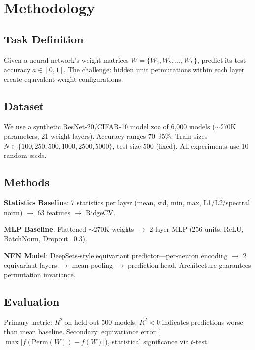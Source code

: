 \section{Methodology}

\subsection{Task Definition}

Given a neural network's weight matrices $W = \{W_1, W_2, \ldots, W_L\}$, predict its test accuracy $a \in [0, 1]$. The challenge: hidden unit permutations within each layer create equivalent weight configurations.

\subsection{Dataset}

We use a synthetic ResNet-20/CIFAR-10 model zoo of 6,000 models ($\sim$270K parameters, 21 weight layers). Accuracy ranges 70--95\%. Train sizes $N \in \{100, 250, 500, 1000, 2500, 5000\}$, test size 500 (fixed). All experiments use 10 random seeds.

\subsection{Methods}

\textbf{Statistics Baseline}: 7 statistics per layer (mean, std, min, max, L1/L2/spectral norm) $\rightarrow$ 63 features $\rightarrow$ RidgeCV.

\textbf{MLP Baseline}: Flattened $\sim$270K weights $\rightarrow$ 2-layer MLP (256 units, ReLU, BatchNorm, Dropout=0.3).

\textbf{NFN Model}: DeepSets-style equivariant predictor---per-neuron encoding $\rightarrow$ 2 equivariant layers $\rightarrow$ mean pooling $\rightarrow$ prediction head. Architecture guarantees permutation invariance.

\subsection{Evaluation}

Primary metric: $R^2$ on held-out 500 models. $R^2 < 0$ indicates predictions worse than mean baseline. Secondary: equivariance error ($\max|f(\text{Perm}(W)) - f(W)|$), statistical significance via $t$-test.
